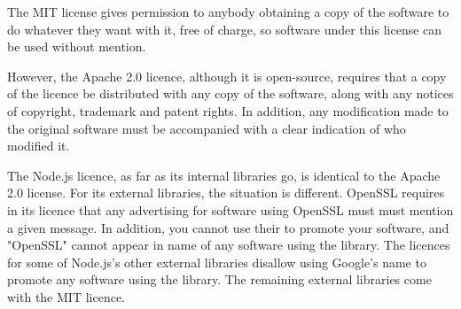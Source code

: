 \documentclass[a4wide, 11pt]{article}
\begin{document}
The MIT license gives permission to anybody obtaining a copy of the software to do whatever they want with it, free of charge, so software under this license can be used without mention.

However, the Apache 2.0 licence, although it is open-source, requires that a copy of the licence be distributed with any copy of the software, along with any notices of copyright, trademark and patent rights. In addition, any modification made to the original software must be accompanied with a clear indication of who modified it.

The Node.js licence, as far as its internal libraries go, is identical to the Apache 2.0 license. For its external libraries, the situation is different. OpenSSL requires in its licence that any advertising for software using OpenSSL must must mention a given message. In addition, you cannot use their to promote your software, and "OpenSSL" cannot appear in name of any software using the library. The licences for some of Node.js's other external libraries disallow using Google's name to promote any software using the library. The remaining external libraries come with the MIT licence.
\end{document}
